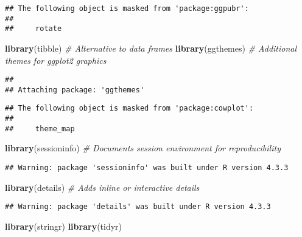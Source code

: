 \documentclass[
]{article}
\newenvironment{Shaded}{\begin{snugshade}}{\end{snugshade}}
\newcommand{\CommentTok}[1]{\textcolor[rgb]{0.56,0.35,0.01}{\textit{#1}}}
\newcommand{\FunctionTok}[1]{\textcolor[rgb]{0.13,0.29,0.53}{\textbf{#1}}}
\newcommand{\NormalTok}[1]{#1}
\begin{document}
\begin{verbatim}
## The following object is masked from 'package:ggpubr':
## 
##     rotate
\end{verbatim}

\begin{Shaded}
\begin{Highlighting}[]
\FunctionTok{library}\NormalTok{(tibble)           }\CommentTok{\# Alternative to data frames}
\FunctionTok{library}\NormalTok{(ggthemes)         }\CommentTok{\# Additional themes for \textquotesingle{}ggplot2\textquotesingle{} graphics}
\end{Highlighting}
\end{Shaded}

\begin{verbatim}
## 
## Attaching package: 'ggthemes'
\end{verbatim}

\begin{verbatim}
## The following object is masked from 'package:cowplot':
## 
##     theme_map
\end{verbatim}

\begin{Shaded}
\begin{Highlighting}[]
\FunctionTok{library}\NormalTok{(sessioninfo)      }\CommentTok{\# Documents session environment for reproducibility}
\end{Highlighting}
\end{Shaded}

\begin{verbatim}
## Warning: package 'sessioninfo' was built under R version 4.3.3
\end{verbatim}

\begin{Shaded}
\begin{Highlighting}[]
\FunctionTok{library}\NormalTok{(details)          }\CommentTok{\# Adds inline or interactive details}
\end{Highlighting}
\end{Shaded}

\begin{verbatim}
## Warning: package 'details' was built under R version 4.3.3
\end{verbatim}

\begin{Shaded}
\begin{Highlighting}[]
\FunctionTok{library}\NormalTok{(stringr)}
\FunctionTok{library}\NormalTok{(tidyr)}
\end{Highlighting}
\end{Shaded}
\end{document}
